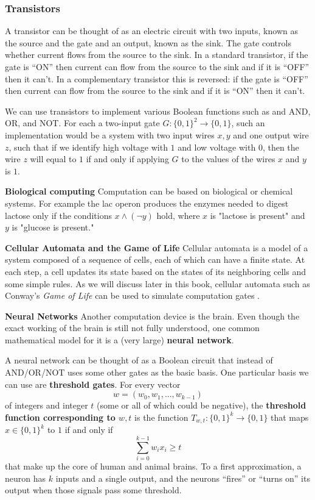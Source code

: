 \documentclass{article}
\begin{document}
  \subsubsection{Transistors}
  A transistor can be thought of as an electric circuit with two inputs, known as the source and the gate and an output, known as the sink. The gate controls whether current flows from the source to the sink. In a standard transistor, if the gate is “ON” then current can flow from the source to the sink and if it is “OFF” then it can’t. In a complementary transistor this is reversed: if the gate is “OFF” then current can flow from the source to the sink and if it is “ON” then it can’t. 

  We can use transistors to implement various Boolean functions such as and AND, OR, and NOT. For each a two-input gate $G: \{0,1\}^2 \longrightarrow \{0,1\}$, such an implementation would be a system with two input wires $x, y$ and one output wire $z$, such that if we identify high voltage with $1$ and low voltage with $0$, then the wire $z$ will equal to $1$ if and only if applying $G$ to the values of the wires $x$ and $y$ is $1$. 

  \textbf{Biological computing} Computation can be based on biological or chemical systems. For example the lac operon produces the enzymes needed to digest lactose only if the conditions $x \wedge (\lnot y)$ hold, where $x$ is "lactose is present" and $y$ is "glucose is present." 


  \textbf{Cellular Automata and the Game of Life} Cellular automata is a model of a system composed of a sequence of cells, each of which can have a finite state. At each step, a cell updates its state based on the states of its neighboring cells and some simple rules. As we will discuss later in this book, cellular automata such as Conway’s \textit{Game of Life} can be used to simulate computation gates .

  \textbf{Neural Networks} Another computation device is the brain. Even though the exact working of the brain is still not fully understood, one common mathematical model for it is a (very large) \textbf{neural network}. 

  A neural network can be thought of as a Boolean circuit that instead of AND/OR/NOT uses some other gates as the basic basis. One particular basis we can use are \textbf{threshold gates}. For every vector
  \[w = (w_0, w_1, ..., w_{k-1})\]
  of integers and integer $t$ (some or all of which could be negative), the \textbf{threshold function corresponding to $w, t$} is the function $T_{w, t} :\{0,1\}^k \longrightarrow \{0,1\}$ that maps $x \in \{0,1\}^k$ to $1$ if and only if
  \[\sum_{i=0}^{k-1} w_i x_i \geq t\]
  that make up the core of human and animal brains. To a first approximation, a neuron has $k$ inputs and a single output, and the neurons “fires” or “turns on” its output when those signals pass some threshold. 
\end{document}
